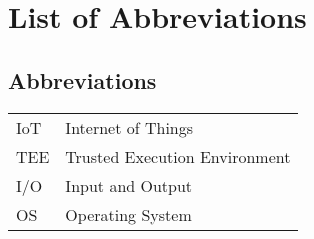 \documentclass[master=cws,masteroption=vs,english]{kulemt}
\begin{document}
\listoffigures
\chapter{List of Abbreviations}
\section*{Abbreviations}
\begin{flushleft}
  \renewcommand{\arraystretch}{1.1}
  \begin{tabularx}{\textwidth}{@{}p{12mm}X@{}}
    IoT   	& Internet of Things \\
    TEE   	& Trusted Execution Environment \\
    I/O   	& Input and Output \\
    	OS		& Operating System
    	
  \end{tabularx}
\end{flushleft}

\mainmatter










%


\backmatter


\end{document}
